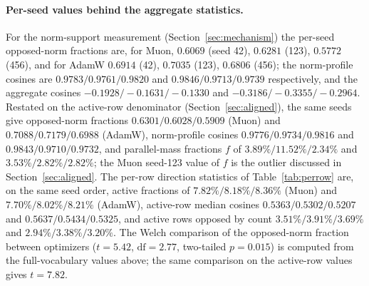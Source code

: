 \paragraph{Per-seed values behind the aggregate statistics.} For the norm-support
measurement (Section~\ref{sec:mechanism}) the per-seed opposed-norm fractions are, for
Muon, $0.6069$ (seed 42), $0.6281$ (123), $0.5772$ (456), and for AdamW $0.6914$ (42),
$0.7035$ (123), $0.6806$ (456); the norm-profile cosines are $0.9783/0.9761/0.9820$
and $0.9846/0.9713/0.9739$ respectively, and the aggregate cosines
${-}0.1928/{-}0.1631/{-}0.1330$ and ${-}0.3186/{-}0.3355/{-}0.2964$. Restated on the active-row
denominator (Section~\ref{sec:aligned}), the same seeds give opposed-norm fractions
$0.6301/0.6028/0.5909$ (Muon) and $0.7088/0.7179/0.6988$ (AdamW), norm-profile cosines
$0.9776/0.9734/0.9816$ and $0.9843/0.9710/0.9732$, and parallel-mass fractions $f$ of
$3.89\%/11.52\%/2.34\%$ and $3.53\%/2.82\%/2.82\%$; the Muon seed-123 value of $f$ is the
outlier discussed in Section~\ref{sec:aligned}. The per-row direction statistics of
Table~\ref{tab:perrow} are, on the same seed order, active fractions of
$7.82\%/8.18\%/8.36\%$ (Muon) and $7.70\%/8.02\%/8.21\%$ (AdamW), active-row median
cosines $0.5363/0.5302/0.5207$ and $0.5637/0.5434/0.5325$, and active rows opposed
by count $3.51\%/3.91\%/3.69\%$ and $2.94\%/3.38\%/3.20\%$. The Welch comparison of the
opposed-norm fraction between optimizers ($t = 5.42$, $\mathrm{df} = 2.77$,
two-tailed $p = 0.015$) is computed from the full-vocabulary values above; the same
comparison on the active-row values gives $t = 7.82$.

